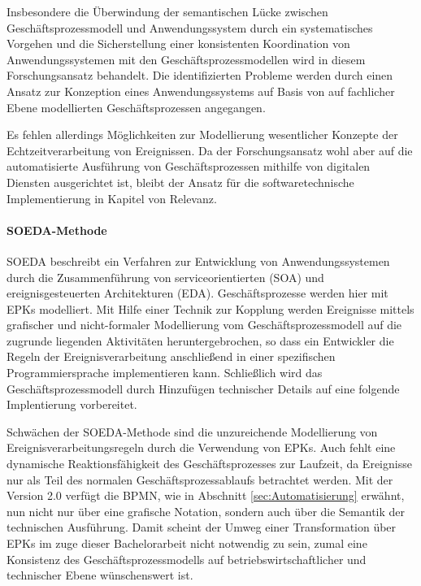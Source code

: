 Insbesondere die Überwindung der semantischen Lücke zwischen Geschäftsprozessmodell und Anwendungssystem durch ein systematisches Vorgehen und die Sicherstellung einer konsistenten Koordination von Anwendungssystemen mit den Geschäftsprozessmodellen wird in diesem Forschungsansatz behandelt. Die identifizierten Probleme werden durch einen Ansatz zur Konzeption eines Anwendungssystems auf Basis von auf fachlicher Ebene modellierten Geschäftsprozessen angegangen. 

Es fehlen allerdings Möglichkeiten zur Modellierung wesentlicher Konzepte der Echtzeitverarbeitung von Ereignissen.
Da der Forschungsansatz wohl aber auf die automatisierte Ausführung von Geschäftsprozessen mithilfe von digitalen Diensten ausgerichtet ist, bleibt der Ansatz für die softwaretechnische Implementierung in Kapitel von Relevanz. 

\paragraph{SOEDA-Methode}
SOEDA beschreibt ein Verfahren zur Entwicklung von Anwendungssystemen durch die Zusammenführung von serviceorientierten (SOA) und ereignisgesteuerten Architekturen (EDA). Geschäftsprozesse werden hier mit \ac{EPK}s modelliert. 
\cite{MatthiasWieland.2009} 
Mit Hilfe einer Technik zur Kopplung werden Ereignisse mittels grafischer und nicht-formaler Modellierung vom Geschäftsprozessmodell auf die zugrunde liegenden Aktivitäten heruntergebrochen, so dass ein Entwickler die Regeln der Ereignisverarbeitung anschließend in einer spezifischen Programmiersprache implementieren kann. 
Schließlich wird das Geschäftsprozessmodell durch Hinzufügen technischer Details auf eine folgende Implentierung vorbereitet.
\cite{Bruns.2010}

Schwächen der SOEDA-Methode sind die unzureichende Modellierung von Ereignisverarbeitungsregeln durch die Verwendung von \ac{EPK}s. 
\cite{RobraBissantz.2009}
Auch fehlt eine dynamische Reaktionsfähigkeit des Geschäftsprozesses zur Laufzeit, da Ereignisse nur als Teil des normalen Geschäftsprozessablaufs betrachtet werden. Mit der Version 2.0 verfügt die \ac{BPMN}, wie in Abschnitt \ref{sec:Automatisierung} erwähnt, nun nicht nur über eine grafische Notation, sondern auch über die Semantik der technischen Ausführung. Damit scheint der Umweg einer Transformation über \ac{EPK}s im zuge dieser Bachelorarbeit nicht notwendig zu sein, zumal eine Konsistenz des Geschäftsprozessmodells auf betriebswirtschaftlicher und technischer Ebene wünschenswert ist.

